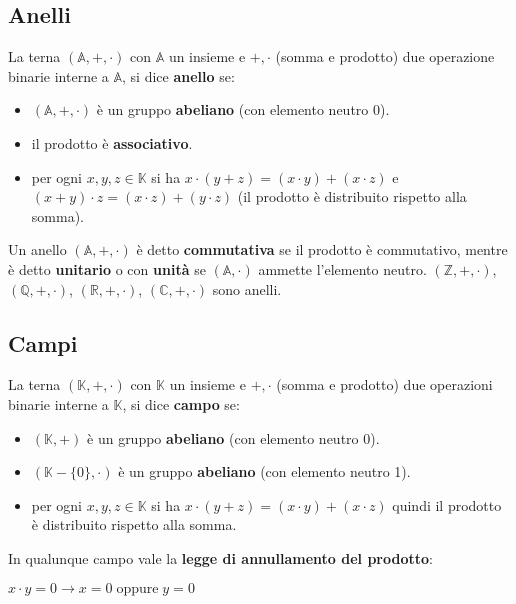\subsection{Anelli}
La terna $(\mathbb{A}, +, \cdot)$ con $\mathbb{A}$ un insieme e $+, \cdot$ (somma e prodotto) due operazione binarie interne a $\mathbb{A}$, si dice \textbf{anello} se:
\begin{itemize}[nosep]
    \item $(\mathbb{A}, +, \cdot)$ è un gruppo \textbf{abeliano} (con elemento neutro 0).
    \item il prodotto è \textbf{associativo}.
    \item per ogni $x,y,z \in \mathbb{K}$ si ha $x \cdot (y + z) = (x \cdot y) + (x \cdot z)$ e $(x + y) \cdot z = (x \cdot z) + (y \cdot z)$ (il prodotto è distribuito rispetto alla somma).
\end{itemize}
Un anello $(\mathbb{A}, +, \cdot)$ è detto \textbf{commutativa} se il prodotto è commutativo, mentre è detto \textbf{unitario} o con \textbf{unità} se $(\mathbb{A}, \cdot)$ ammette l'elemento neutro. $(\mathbb{Z}, +, \cdot)$, $(\mathbb{Q}, +, \cdot)$, $(\mathbb{R}, +, \cdot)$, $(\mathbb{C}, +, \cdot)$ sono anelli.

\subsection{Campi}
La terna $(\mathbb{K}, +, \cdot)$ con $\mathbb{K}$ un insieme e $+, \cdot$ (somma e prodotto) due operazioni binarie interne a $\mathbb{K}$, si dice \textbf{campo} se:
\begin{itemize}[nosep]
    \item $(\mathbb{K}, +)$ è un gruppo \textbf{abeliano} (con elemento neutro 0).
    \item $(\mathbb{K} - \{0\}, \cdot)$ è un gruppo \textbf{abeliano} (con elemento neutro 1).
    \item per ogni $x,y,z \in \mathbb{K}$ si ha $x \cdot (y + z) = (x \cdot y) + (x \cdot z)$ quindi il prodotto è distribuito rispetto alla somma.
\end{itemize}
In qualunque campo vale la \textbf{legge di annullamento del prodotto}:
\begin{center}
    $x \cdot y = 0 \rightarrow x = 0 \; \text{oppure} \; y = 0$
\end{center}

